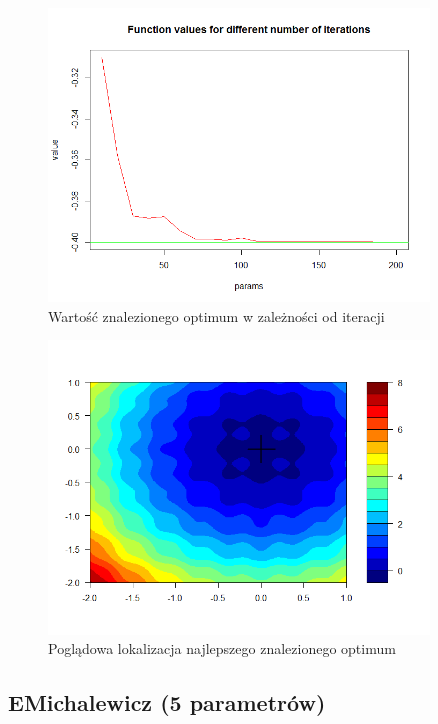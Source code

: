 \documentclass[11pt, a4paper]{article}
\begin{document}
\begin{figure}[H]
	\begin{center}
		\includegraphics[width=0.9\textwidth]{./assets/CosMix46.png} %
		\caption{Wartość znalezionego optimum w zależności od iteracji}
		\label{fig:gulf7}
	\end{center}
\end{figure}
\begin{figure}[H]
	\begin{center}
		\includegraphics[width=0.9\textwidth]{./assets/CosMix47.png} %
		\caption{Poglądowa lokalizacja najlepszego znalezionego optimum}
		\label{fig:gulf7}
	\end{center}
\end{figure}

\subsection{EMichalewicz (5 parametrów)}
\end{document}
